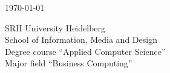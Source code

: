 \begin{titlepage}
\begin{center}
\vspace{3em}

{\normalsize {\today}}\\

\vspace{2em}

{\Large SRH University Heidelberg}\\
{\Large School of Information, Media and Design}\\
{\Large Degree course ``Applied Computer Science''}\\
{\Large Major field ``Business Computing''}\\

\vspace{3em}

\begin{normalsize}
\hspace{3cm}\\
\vspace{0.5em}
\makebox{}\hspace{3.95cm}\\
\end{normalsize}
\end{center}

\vspace*{\fill}
\end{titlepage}